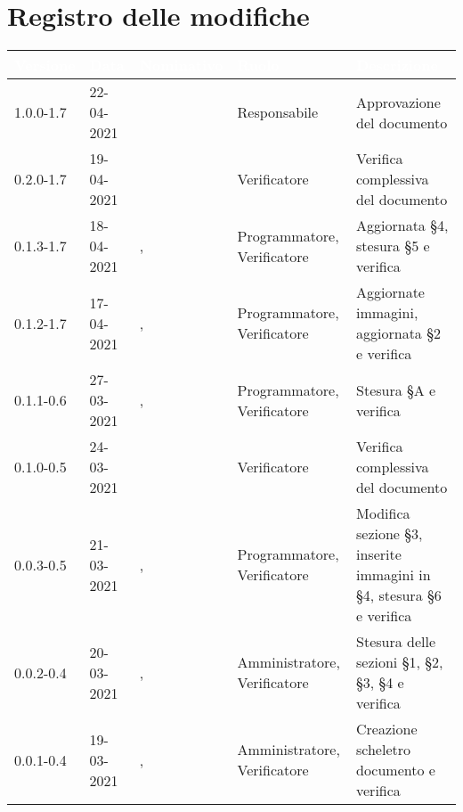 \section*{Registro delle modifiche}
\setcounter{table}{-1}
{
\renewcommand{\arraystretch}{1.5}
\centering
\begin{longtable}{C{1.7cm} | C{2.2cm} | C{3.2cm} | C{3cm} | C{4.8cm}}
\textcolor{white}{\textbf{Versione}}&
\textcolor{white}{\textbf{Data}}&
\textcolor{white}{\textbf{Nominativo}}&
\textcolor{white}{\textbf{Ruolo}}&
\textcolor{white}{\textbf{Descrizione}}\\	
\endhead

1.0.0-1.7 & 22-04-2021 & \RA{} & Responsabile & Approvazione del documento \\
0.2.0-1.7 & 19-04-2021 & \BM{} & Verificatore & Verifica complessiva del documento \\

0.1.3-1.7 & 18-04-2021 & \SH{}, \BM{} & Programmatore, Verificatore & Aggiornata \S 4, stesura \S 5 e verifica \\

0.1.2-1.7 & 17-04-2021 & \SH{}, \SG{} & Programmatore, Verificatore & Aggiornate immagini, aggiornata \S 2 e verifica \\

0.1.1-0.6 & 27-03-2021 & \SG{}, \SH{} & Programmatore, Verificatore & Stesura \S A e verifica \\
0.1.0-0.5 & 24-03-2021 & \SP{} & Verificatore & Verifica complessiva del documento \\
0.0.3-0.5 & 21-03-2021 & \BM{}, \SH{} & Programmatore, Verificatore & Modifica sezione \S 3, inserite immagini in \S 4, stesura \S 6 e verifica \\
0.0.2-0.4 & 20-03-2021 & \SG{}, \PA{}   & Amministratore, Verificatore & Stesura delle sezioni \S 1, \S 2, \S 3, \S 4 e verifica \\
0.0.1-0.4 & 19-03-2021 & \SG{}, \ZM{} & Amministratore, Verificatore & Creazione scheletro documento e verifica\\
		
\end{longtable}
}